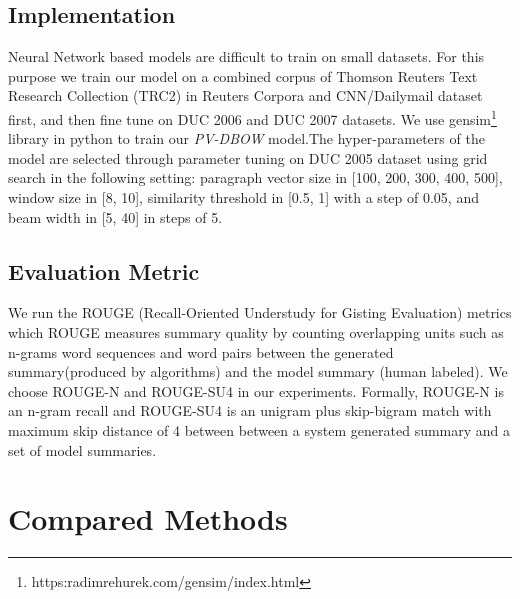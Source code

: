 \documentclass[11pt,a4paper]{article}
\begin{document}
\subsection{Implementation}

Neural Network based models are difficult to train on small datasets. For this purpose we train our model on a combined corpus of Thomson Reuters Text Research Collection (TRC2) in Reuters Corpora \cite{trc2} and CNN/Dailymail dataset first, and then fine tune on DUC 2006 and DUC 2007 datasets. We use gensim\footnote{https:radimrehurek.com/gensim/index.html} library in python to train our \textit{PV-DBOW} model.The hyper-parameters of the model are selected through parameter tuning on DUC 2005 dataset using grid search in the following setting: paragraph vector size in [100, 200, 300, 400, 500], window size in [8, 10], similarity threshold in [0.5, 1] with a step of 0.05, and beam width in [5, 40] in steps of 5.
\begin{table}[ht]
\caption{\% Average F-measure on DUC 2007} %
\centering 
{}
\end{table}
\subsection{Evaluation Metric}

We run the ROUGE (Recall-Oriented Understudy for Gisting Evaluation) metrics \cite{rouge} which ROUGE measures summary quality by counting overlapping units such as n-grams word sequences and word pairs between the generated summary(produced by algorithms) and the model summary (human labeled). We choose ROUGE-N and ROUGE-SU4 in our experiments. Formally, ROUGE-N is an n-gram recall and ROUGE-SU4 is an unigram plus skip-bigram match with maximum skip distance of 4 between between a system generated summary and a set of model summaries.


\section{Compared Methods}
\end{document}
